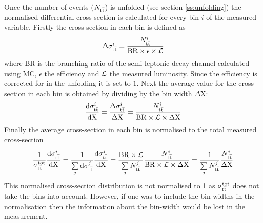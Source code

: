 Once the number of \ttbar events ($N_{\mathrm{t}\overline{\mathrm{t}}}$) is unfolded (see section \ref{ss:unfolding}) the normalised
differential cross-section is calculated for every bin $i$ of the measured variable. Firstly the cross-section in each bin is
defined as
\begin{equation}
\label{eq:finll_1}
\Delta\sigma_{\mathrm{t}\overline{\mathrm{t}}}^i = \frac{N_{\mathrm{t}\overline{\mathrm{t}}}^i}{\mathrm{BR} \times \epsilon \times {\cal L}} 
\end{equation}
where BR is the branching ratio of the semi-leptonic decay channel calculated using MC, $\epsilon$ the \ttbar efficiency
and ${\cal L}$ the measured luminosity. Since the efficiency is corrected for in the unfolding it is set to $1$.
Next the average value for the cross-section in each bin is obtained by dividing by the bin width $\Delta \mathrm{X}$:
\begin{equation}
\frac{\mathrm{d}\sigma_{\mathrm{t}\overline{\mathrm{t}}}^i}{\mathrm{d} \mathrm{X}} =
\frac{\Delta\sigma_{\mathrm{t}\overline{\mathrm{t}}}^i}{\Delta \mathrm{X} } = \frac{N_{\mathrm{t}\overline{\mathrm{t}}}^i}{\mathrm{BR} \times {\cal L} \times \Delta \mathrm{X}} 
\end{equation}
Finally the average cross-section in each bin is normalised to the total measured cross-section
\begin{equation}
\label{eq:normalisedxs}
\frac{1}{\sigma_{\mathrm{t}\overline{\mathrm{t}}}^\mathrm{tot}} \frac{\mathrm{d}\sigma_{\mathrm{t}\overline{\mathrm{t}}}^i}{\mathrm{d} \mathrm{X}} =
\frac{1}{\sum\limits_{j}{\mathrm{d}\sigma_{\mathrm{t}\overline{\mathrm{t}}}^j}} \frac{\mathrm{d}\sigma_{\mathrm{t}\overline{\mathrm{t}}}^j}{\mathrm{d} \mathrm{X}} =
\frac{\mathrm{BR} \times {\cal L}}{\sum\limits_{j}{N_{\mathrm{t}\overline{\mathrm{t}}}^j}}\frac{N_{\mathrm{t}\overline{\mathrm{t}}}^i}{\mathrm{BR} \times {\cal L} \times \Delta
\mathrm{X}} = \frac{1}{\sum\limits_{j}{N_{\mathrm{t}\overline{\mathrm{t}}}^j}}\frac{N_{\mathrm{t}\overline{\mathrm{t}}}^i}{\Delta\mathrm{X}}
\end{equation}
This normalised cross-section distribution is not normalised to 1 as $\sigma_{\mathrm{t}\overline{\mathrm{t}}}^\mathrm{tot}$ does not take the bins
into account. However, if one was to include the bin widths in the normalisation then the information about the
bin-width would be lost in the measurement.


		